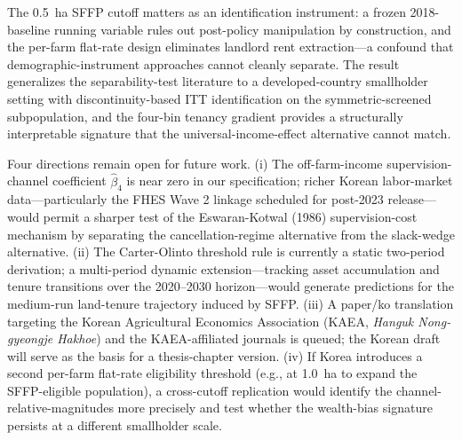 \documentclass[12pt, a4paper]{article}
\begin{document}
The 0.5~ha SFFP cutoff matters as an identification instrument: a frozen 2018-baseline running variable rules out post-policy manipulation by construction, and the per-farm flat-rate design eliminates landlord rent extraction---a confound that demographic-instrument approaches \citep{Benjamin1992_separation, LaFaveThomas2016_markets} cannot cleanly separate. The result generalizes the separability-test literature to a developed-country smallholder setting with discontinuity-based ITT identification on the symmetric-screened subpopulation, and the four-bin tenancy gradient provides a structurally interpretable signature that the universal-income-effect alternative cannot match.

Four directions remain open for future work. (i) The off-farm-income supervision-channel coefficient $\hat\beta_4$ is near zero in our specification; richer Korean labor-market data---particularly the FHES Wave 2 linkage scheduled for post-2023 release---would permit a sharper test of the Eswaran-Kotwal (1986) supervision-cost mechanism by separating the cancellation-regime alternative from the slack-wedge alternative. (ii) The Carter-Olinto threshold rule is currently a static two-period derivation; a multi-period dynamic extension---tracking asset accumulation and tenure transitions over the 2020--2030 horizon---would generate predictions for the medium-run land-tenure trajectory induced by SFFP. (iii) A paper/ko translation targeting the Korean Agricultural Economics Association (KAEA, \textit{Hanguk Nong-gyeongje Hakhoe}) and the KAEA-affiliated journals is queued; the Korean draft will serve as the basis for a thesis-chapter version. (iv) If Korea introduces a second per-farm flat-rate eligibility threshold (e.g., at 1.0~ha to expand the SFFP-eligible population), a cross-cutoff replication would identify the channel-relative-magnitudes more precisely and test whether the wealth-bias signature persists at a different smallholder scale.



\end{document}
